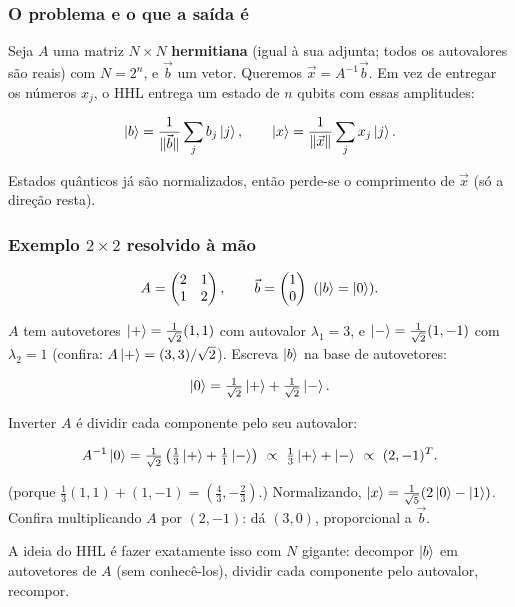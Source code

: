 \subsubsection{O problema e o que a saída é}\label{o-problema-e-o-que-a-sauxedda-uxe9}

Seja \(A\) uma matriz \(N\times N\) \textbf{hermitiana} (igual à sua adjunta; todos os autovalores são reais) com \(N=2^n\), e \(\vec b\) um vetor. Queremos \(\vec x=A^{-1}\vec b\). Em vez de entregar os números \(x_j\), o HHL entrega um estado de \(n\) qubits com essas amplitudes:

\[
\left|{b}\right>=\frac{1}{\|\vec b\|}\sum_j b_j\left|{j}\right>,\qquad \left|{x}\right>=\frac{1}{\|\vec x\|}\sum_j x_j\left|{j}\right> .
\]

Estados quânticos já são normalizados, então perde-se o comprimento de \(\vec x\) (só a direção resta).

\subsubsection{\texorpdfstring{Exemplo \(2\times2\) resolvido à mão}{Exemplo 2\textbackslash times2 resolvido à mão}}\label{exemplo-2times2-resolvido-uxe0-muxe3o}

\[
A=\begin{pmatrix}2&1\\1&2\end{pmatrix},\qquad \vec b=\begin{pmatrix}1\\0\end{pmatrix}\ (\left|{b}\right>=\left|{0}\right>).
\]

\(A\) tem autovetores \(\left|{+}\right>=\tfrac1{\sqrt2}(1,1)\) com autovalor \(\lambda_1=3\), e \(\left|{-}\right>=\tfrac1{\sqrt2}(1,-1)\) com \(\lambda_2=1\) (confira: \(A\left|{+}\right>=(3,3)/\sqrt2\)). Escreva \(\left|{b}\right>\) na base de autovetores:

\[
\left|{0}\right>=\tfrac1{\sqrt2}\left|{+}\right> + \tfrac1{\sqrt2}\left|{-}\right>.
\]

Inverter \(A\) é dividir cada componente pelo seu autovalor:

\[
A^{-1}\ket0=\tfrac1{\sqrt2}\left(\tfrac13\ket+ + \tfrac11\ket-\right)\ \propto\ \tfrac13\ket++\ket-\ \propto\ (2,-1)^T.
\]

(porque \(\tfrac13(1,1)+(1,-1)=(\tfrac43,-\tfrac23)\).) Normalizando, \(\left|{x}\right>=\tfrac1{\sqrt5}(2\left|{0}\right>-\left|{1}\right>)\). Confira multiplicando \(A\) por \((2,-1)\): dá \((3,0)\), proporcional a \(\vec b\).

A ideia do HHL é fazer exatamente isso com \(N\) gigante: decompor \(\left|{b}\right>\) em autovetores de \(A\) (sem conhecê-los), dividir cada componente pelo autovalor, recompor.

